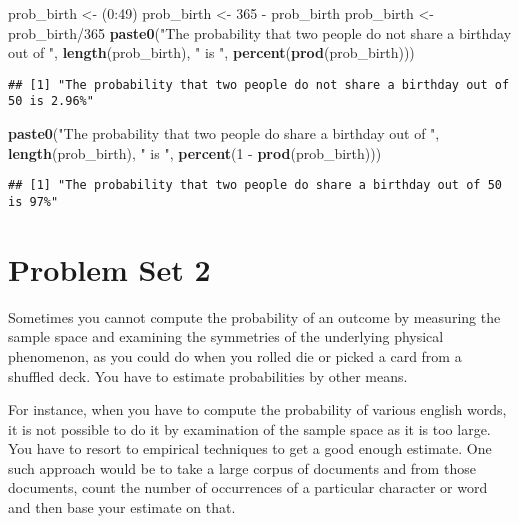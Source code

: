 \documentclass[]{article}
\newenvironment{Shaded}{\begin{snugshade}}{\end{snugshade}}
\newcommand{\KeywordTok}[1]{\textcolor[rgb]{0.13,0.29,0.53}{\textbf{{#1}}}}
\newcommand{\DecValTok}[1]{\textcolor[rgb]{0.00,0.00,0.81}{{#1}}}
\newcommand{\StringTok}[1]{\textcolor[rgb]{0.31,0.60,0.02}{{#1}}}
\newcommand{\NormalTok}[1]{{#1}}
\begin{document}
\begin{Shaded}
\begin{Highlighting}[]
\NormalTok{prob_birth <-}\StringTok{ }\NormalTok{(}\DecValTok{0}\NormalTok{:}\DecValTok{49}\NormalTok{)}
\NormalTok{prob_birth <-}\StringTok{ }\DecValTok{365} \NormalTok{-}\StringTok{ }\NormalTok{prob_birth}
\NormalTok{prob_birth <-}\StringTok{ }\NormalTok{prob_birth/}\DecValTok{365}
\KeywordTok{paste0}\NormalTok{(}\StringTok{"The probability that two people do not share a birthday out of "}\NormalTok{, }
       \KeywordTok{length}\NormalTok{(prob_birth), }\StringTok{" is "}\NormalTok{, }\KeywordTok{percent}\NormalTok{(}\KeywordTok{prod}\NormalTok{(prob_birth)))}
\end{Highlighting}
\end{Shaded}

\begin{verbatim}
## [1] "The probability that two people do not share a birthday out of 50 is 2.96%"
\end{verbatim}

\begin{Shaded}
\begin{Highlighting}[]
\KeywordTok{paste0}\NormalTok{(}\StringTok{"The probability that two people do share a birthday out of "}\NormalTok{, }
       \KeywordTok{length}\NormalTok{(prob_birth), }\StringTok{" is "}\NormalTok{, }\KeywordTok{percent}\NormalTok{(}\DecValTok{1} \NormalTok{-}\StringTok{ }\KeywordTok{prod}\NormalTok{(prob_birth)))}
\end{Highlighting}
\end{Shaded}

\begin{verbatim}
## [1] "The probability that two people do share a birthday out of 50 is 97%"
\end{verbatim}

\newpage

\section{Problem Set 2}\label{problem-set-2}

Sometimes you cannot compute the probability of an outcome by measuring
the sample space and examining the symmetries of the underlying physical
phenomenon, as you could do when you rolled die or picked a card from a
shuffled deck. You have to estimate probabilities by other means.

For instance, when you have to compute the probability of various
english words, it is not possible to do it by examination of the sample
space as it is too large. You have to resort to empirical techniques to
get a good enough estimate. One such approach would be to take a large
corpus of documents and from those documents, count the number of
occurrences of a particular character or word and then base your
estimate on that.
\end{document}
